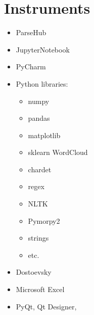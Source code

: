 \section{Instruments}
\begin{frame}
\begin{itemize}
    \item ParseHub
    \item JupyterNotebook
    \item PyCharm
    \item Python libraries: 
    \begin{itemize}
        \item numpy
        \item pandas
        \item matplotlib
        \item sklearn
        \tem WordCloud
        \item chardet
        \item regex
        \item NLTK
        \item Pymorpy2
        \item strings
        \item etc.
    \end{itemize}
    \item Dostoevsky
    \item Microsoft Excel
    \item PyQt, Qt Designer,
\end{itemize}
\end{frame}